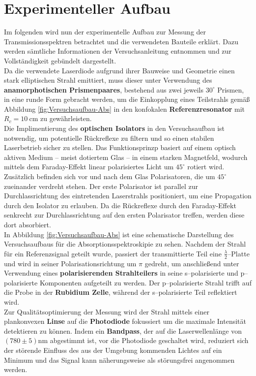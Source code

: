 \chapter{Experimenteller Aufbau}
\label{chap:experiment}

\noindent Im folgenden wird nun der experimentelle Aufbau zur Messung der Transmissionsspektren betrachtet und die verwendeten Bauteile erklärt. Dazu werden sämtliche Informationen der Versuchsanleitung \cite{H2} entnommen und zur Vollständigkeit gebündelt dargestellt.\\


\noindent Da die verwendete Laserdiode aufgrund ihrer Bauweise und Geometrie einen stark elliptischen Strahl emittiert, muss dieser unter Verwendung des \textbf{anamorphotischen Prismenpaares}, bestehend aus zwei jeweils $30^\circ$ Prismen, in eine runde Form gebracht werden, um die Einkopplung eines Teilstrahls gemäß Abbildung \ref{fig:Versuchsaufbau-Abs} in den konfokalen \textbf{Referenzresonator} mit $R_{c}=\SI{10}{\centi \meter}$ zu gewährleisten.\\
\noindent Die Implimentierung des \textbf{optischen Isolators} in den Versuchsaufbau ist notwendig, um potentielle Rückreflexe zu filtern und so einen stabilen Laserbetrieb sicher zu stellen. Das Funktionsprinzp basiert auf einem optisch aktiven Medium -- meist dotiertem Glas -- in einem starken Magnetfeld, wodurch mittels dem Faraday-Effekt linear polarisiertes Licht um $45^\circ$ rotiert wird. Zusätzlich befinden sich vor und nach dem Glas Polarisatoren, die um $45^\circ$ zueinander verdreht stehen. Der erste Polarisator ist parallel zur Durchlassrichtung des eintretenden Laserstrahls positioniert, um eine Propagation durch den Isolator zu erlauben. Da die Rückreflexe durch den Faraday-Effekt senkrecht zur Durchlassrichtung auf den ersten Polarisator treffen, werden diese dort absorbiert.\\
\noindent In Abbildung \ref{fig:Versuchsaufbau-Abs} ist eine schematische Darstellung des Versuchsaufbaus für die Absorptionsspektroskipie zu sehen. Nachdem der Strahl für ein Referenzsignal geteilt wurde, passiert der transmittierte Teil eine \textbf{$\frac{\lambda}{2}$}--Platte und wird in seiner Polarisationsrichtung um $\pi$ gedreht, um anschließend unter Verwendung eines \textbf{polarisierenden Strahlteilers} in seine s--polarisierte und p--polarisierte Komponenten aufgeteilt zu werden. Der p--polarisierte Strahl trifft auf die Probe in der \textbf{Rubidium Zelle}, während der s--polarisierte Teil reflektiert wird. \\
\noindent Zur Qualitätsoptimierung der Messung wird der Strahl mittels einer plankonvexen \textbf{Linse} auf die \textbf{Photodiode} fokussiert um die maximale Intensität detektieren zu können. Indem ein \textbf{Bandpass}, der auf die Laserwellenlänge von $(780 \pm 5)$nm abgestimmt ist, vor die Photodiode geschaltet wird, reduziert sich der störende Einfluss des aus der Umgebung kommenden Lichtes auf ein Minimum und das Signal kann näherungsweise als störungsfrei angenommen werden.

